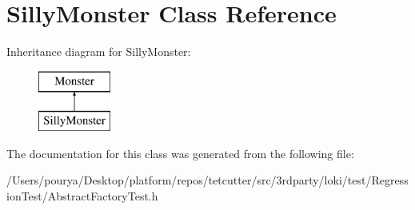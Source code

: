 \hypertarget{classSillyMonster}{}\section{Silly\+Monster Class Reference}
\label{classSillyMonster}
Inheritance diagram for Silly\+Monster\+:\begin{figure}[H]
\begin{center}
\leavevmode
\includegraphics[height=2.000000cm]{classSillyMonster}
\end{center}
\end{figure}


The documentation for this class was generated from the following file\+:\begin{DoxyCompactItemize}
\item 
/\+Users/pourya/\+Desktop/platform/repos/tetcutter/src/3rdparty/loki/test/\+Regression\+Test/Abstract\+Factory\+Test.\+h\end{DoxyCompactItemize}
